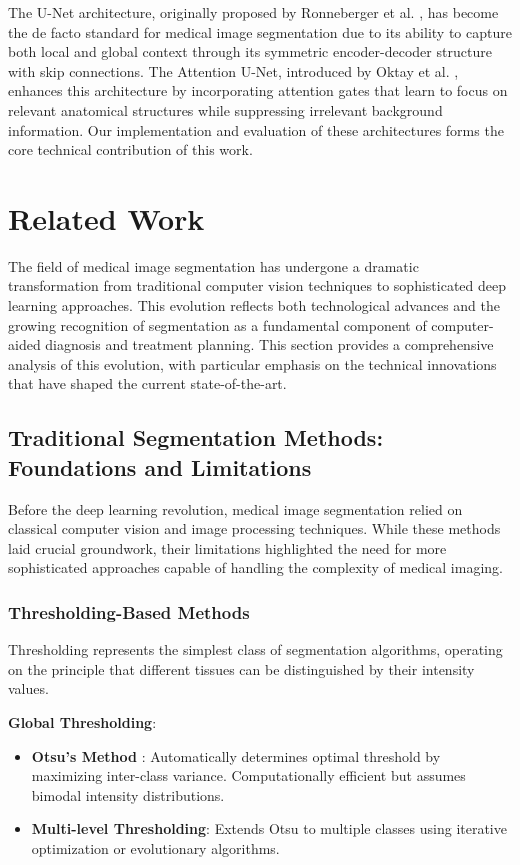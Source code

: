 \documentclass[12pt,a4paper]{article}
\begin{document}
The U-Net architecture, originally proposed by Ronneberger et al. \cite{ronneberger2015u}, has become the de facto standard for medical image segmentation due to its ability to capture both local and global context through its symmetric encoder-decoder structure with skip connections. The Attention U-Net, introduced by Oktay et al. \cite{oktay2018attention}, enhances this architecture by incorporating attention gates that learn to focus on relevant anatomical structures while suppressing irrelevant background information. Our implementation and evaluation of these architectures forms the core technical contribution of this work.

\section{Related Work}

The field of medical image segmentation has undergone a dramatic transformation from traditional computer vision techniques to sophisticated deep learning approaches. This evolution reflects both technological advances and the growing recognition of segmentation as a fundamental component of computer-aided diagnosis and treatment planning. This section provides a comprehensive analysis of this evolution, with particular emphasis on the technical innovations that have shaped the current state-of-the-art.

\subsection{Traditional Segmentation Methods: Foundations and Limitations}

Before the deep learning revolution, medical image segmentation relied on classical computer vision and image processing techniques. While these methods laid crucial groundwork, their limitations highlighted the need for more sophisticated approaches capable of handling the complexity of medical imaging.

\subsubsection{Thresholding-Based Methods}

Thresholding represents the simplest class of segmentation algorithms, operating on the principle that different tissues can be distinguished by their intensity values.

\textbf{Global Thresholding}:
\begin{itemize}
    \item \textbf{Otsu's Method} \cite{otsu1979threshold}: Automatically determines optimal threshold by maximizing inter-class variance. Computationally efficient but assumes bimodal intensity distributions.
    \item \textbf{Multi-level Thresholding}: Extends Otsu to multiple classes using iterative optimization or evolutionary algorithms.
\end{itemize}
\end{document}
